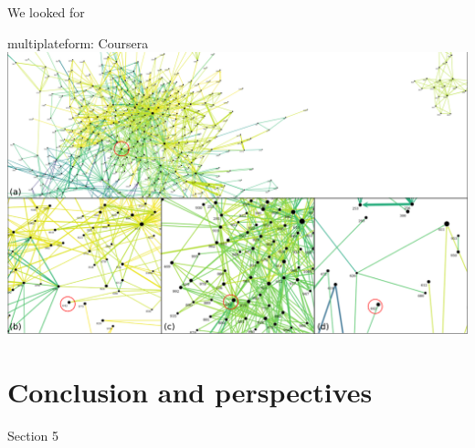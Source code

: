 \documentclass{beamer}
\begin{document}
\begin{frame}{We looked for}
{{      \begin{block}{multiplateform: Coursera}
        \centering
        \includegraphics[width=.9\textwidth]{./Images/evolution}
      \end{block}
    }
  }
\end{frame}

\section{Conclusion and perspectives}
\begin{frame}{Section 5}
  \tableofcontents[sectionstyle=show/shaded,
  subsectionstyle=show/show/hide]
\end{frame}
\end{document}
